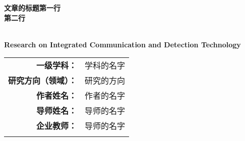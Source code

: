 \begin{titlepage}
    \centering
    \thispagestyle{empty} 
    \erhao \textbf{文章的标题第一行\\第二行}  %

    \Large \textbf{\\ Research on Integrated Communication and Detection Technology} %

    \vfill

    \begin{table}[!b]
        \centering
        \fontsize{12pt}{20pt}\selectfont
        \begin{tabular}{rm{}}
            \textbf{一级学科：} & 学科的名字 \\ \cline{2-2}
            \textbf{研究方向（领域）：} & 研究的方向 \\ \cline{2-2}
            \textbf{作者姓名：} & 作者的名字 \\ \cline{2-2}
            \textbf{导师姓名：} & 导师的名字 \\ \cline{2-2}
            \textbf{企业教师：} & 导师的名字 \\ \cline{2-2}
            \multicolumn{2}{c}{}
            \label{tab:Names}
        \end{tabular}
    \end{table}


\end{titlepage}
